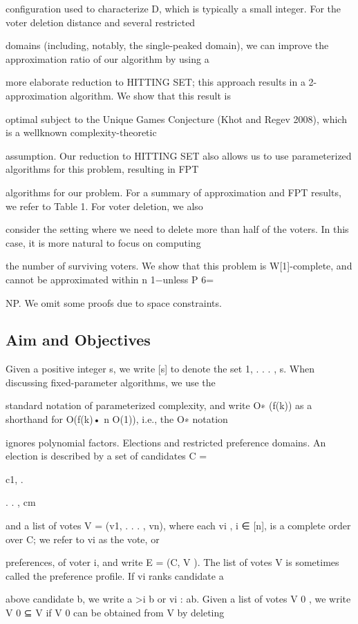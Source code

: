 \documentclass[12pt, a4paper]{report}
\begin{document}
configuration used to characterize D, which is typically a small integer. For the voter deletion distance and several restricted 

domains (including, notably, the single-peaked domain), we can improve the approximation ratio of our algorithm by using a 

more elaborate reduction to HITTING SET; this approach results in a 2-approximation algorithm. We show that this result is 

optimal subject to the Unique Games Conjecture (Khot and Regev 2008), which is a wellknown complexity-theoretic 

assumption. Our reduction to HITTING SET also allows us to use parameterized algorithms for this problem, resulting in FPT 

algorithms for our problem. For a summary of approximation and FPT results, we refer to Table 1. For voter deletion, we also 

consider the setting where we need to delete more than half of the voters. In this case, it is more natural to focus on computing 

the number of surviving voters. We show that this problem is W[1]-complete, and cannot be approximated within n 1−unless P 6= 

NP. We omit some proofs due to space constraints.
\subsection*{Aim and Objectives}
Given a positive integer s, we write [s] to denote the set {1, . . . , s}. When discussing fixed-parameter algorithms, we use the 

standard notation of parameterized complexity, and write O∗ (f(k)) as a shorthand for O(f(k)• n O(1)), i.e., the O∗ notation 

ignores polynomial factors. Elections and restricted preference domains. An election is described by a set of candidates C = {c1, . 

. . , cm} and a list of votes V = (v1, . . . , vn), where each vi , i ∈ [n], is a complete order over C; we refer to vi as the vote, or 

preferences, of voter i, and write E = (C, V ). The list of votes V is sometimes called the preference profile. If vi ranks candidate a 

above candidate b, we write a >i b or vi : ab. Given a list of votes V 0 , we write V 0 ⊆ V if V 0 can be obtained from V by deleting 
\end{document}
